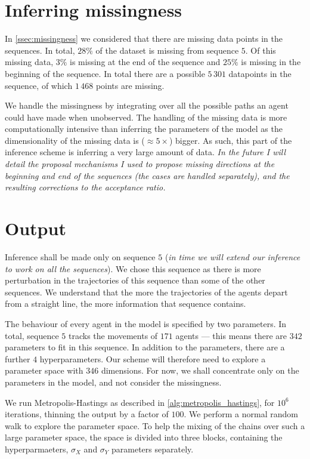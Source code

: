 \section{Inferring missingness}
\label{ssec:vicsek_paths}


In \cref{ssec:missingness} we considered that there are missing data points in the sequences. In 
total, $28\%$ of the dataset is missing from sequence $5$. Of this missing data, $3\%$ is missing at 
the end of the sequence and $25\%$ is missing in the beginning of the sequence. In total there are a 
possible $5\,301$ datapoints in the sequence, of which $1\,468$ points are missing.

We handle the missingness by integrating over all the possible paths an agent could have made when 
unobserved. The handling of the missing data is more computationally intensive than inferring the 
parameters of the model as the dimensionality of the missing data is ($\approx 5 \times$) bigger. As 
such, this part of the inference scheme is inferring a very large amount of data. \emph{In the future 
I will detail the proposal mechanisms I used to propose missing directions at the beginning and end 
of the sequences (the cases are handled separately), and the resulting corrections to the acceptance 
ratio.}

\section{Output}
\label{ssec:vicsek_params}

Inference shall be made only on sequence $5$ (\emph{in time we will extend our inference to work on 
all the sequences}). We chose this sequence as there is more perturbation in the trajectories of this 
sequence than some of the other sequences. We understand that the more the trajectories of the agents 
depart from a straight line, the more information that sequence contains.

The behaviour of every agent in the model is specified by two parameters. In total, sequence $5$ 
tracks the movements of $171$ agents --- this means there are $342$ parameters to fit in this 
sequence. In addition to the parameters, there are a further $4$ hyperparameters. Our scheme will 
therefore need to explore a parameter space with $346$ dimensions. For now, we shall concentrate only 
on the parameters in the model, and not consider the missingness.

We run Metropolis-Hastings as described in \cref{alg:metropolis_hastings}, for $10^6$ iterations, 
thinning the output by a factor of $100$. We perform a normal random walk to explore the parameter 
space. To help the mixing of the chains over such a large parameter space, the space is divided into 
three blocks, containing the hyperparmaeters, $\sigma_X$ and $\sigma_Y$ parameters separately.

